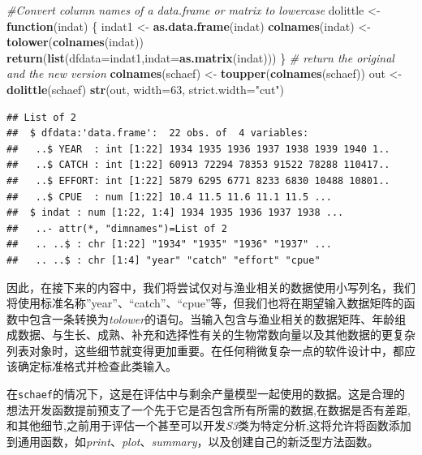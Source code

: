 \documentclass[
  lang=cn,
  11pt,
  scheme=chinese,
  chinesefont=nofont,
  citestyle=gb7714-2015,
  bibstyle=gb7714-2015]{elegantbook}
\newenvironment{Shaded}{\begin{snugshade}}{\end{snugshade}}
\newcommand{\AttributeTok}[1]{\textcolor[rgb]{0.13,0.29,0.53}{#1}}
\newcommand{\CommentTok}[1]{\textcolor[rgb]{0.56,0.35,0.01}{\textit{#1}}}
\newcommand{\ControlFlowTok}[1]{\textcolor[rgb]{0.13,0.29,0.53}{\textbf{#1}}}
\newcommand{\DecValTok}[1]{\textcolor[rgb]{0.00,0.00,0.81}{#1}}
\newcommand{\FunctionTok}[1]{\textcolor[rgb]{0.13,0.29,0.53}{\textbf{#1}}}
\newcommand{\NormalTok}[1]{#1}
\newcommand{\OtherTok}[1]{\textcolor[rgb]{0.56,0.35,0.01}{#1}}
\newcommand{\StringTok}[1]{\textcolor[rgb]{0.31,0.60,0.02}{#1}}
\begin{document}
\begin{Shaded}
\begin{Highlighting}[]
 \CommentTok{\#Convert column names of a data.frame or matrix to lowercase  }
\NormalTok{dolittle }\OtherTok{\textless{}{-}} \ControlFlowTok{function}\NormalTok{(indat) \{  }
\NormalTok{   indat1 }\OtherTok{\textless{}{-}} \FunctionTok{as.data.frame}\NormalTok{(indat)  }
   \FunctionTok{colnames}\NormalTok{(indat) }\OtherTok{\textless{}{-}} \FunctionTok{tolower}\NormalTok{(}\FunctionTok{colnames}\NormalTok{(indat))  }
   \FunctionTok{return}\NormalTok{(}\FunctionTok{list}\NormalTok{(}\AttributeTok{dfdata=}\NormalTok{indat1,}\AttributeTok{indat=}\FunctionTok{as.matrix}\NormalTok{(indat)))  }
\NormalTok{\} }\CommentTok{\# return the original and the new version  }
\FunctionTok{colnames}\NormalTok{(schaef) }\OtherTok{\textless{}{-}} \FunctionTok{toupper}\NormalTok{(}\FunctionTok{colnames}\NormalTok{(schaef))  }
\NormalTok{out }\OtherTok{\textless{}{-}} \FunctionTok{dolittle}\NormalTok{(schaef)  }
\FunctionTok{str}\NormalTok{(out, }\AttributeTok{width=}\DecValTok{63}\NormalTok{, }\AttributeTok{strict.width=}\StringTok{"cut"}\NormalTok{)  }
\end{Highlighting}
\end{Shaded}

\begin{verbatim}
## List of 2
##  $ dfdata:'data.frame':  22 obs. of  4 variables:
##   ..$ YEAR  : int [1:22] 1934 1935 1936 1937 1938 1939 1940 1..
##   ..$ CATCH : int [1:22] 60913 72294 78353 91522 78288 110417..
##   ..$ EFFORT: int [1:22] 5879 6295 6771 8233 6830 10488 10801..
##   ..$ CPUE  : num [1:22] 10.4 11.5 11.6 11.1 11.5 ...
##  $ indat : num [1:22, 1:4] 1934 1935 1936 1937 1938 ...
##   ..- attr(*, "dimnames")=List of 2
##   .. ..$ : chr [1:22] "1934" "1935" "1936" "1937" ...
##   .. ..$ : chr [1:4] "year" "catch" "effort" "cpue"
\end{verbatim}

因此，在接下来的内容中，我们将尝试仅对与渔业相关的数据使用小写列名，我们将使用标准名称''year''、``catch''、``cpue''等，但我们也将在期望输入数据矩阵的函数中包含一条转换为\emph{tolower}的语句。当输入包含与渔业相关的数据矩阵、年龄组成数据、与生长、成熟、补充和选择性有关的生物常数向量以及其他数据的更复杂列表对象时，这些细节就变得更加重要。在任何稍微复杂一点的软件设计中，都应该确定标准格式并检查此类输入。

在\texttt{schaef}的情况下，这是在评估中与剩余产量模型一起使用的数据。这是合理的想法开发函数提前预支了一个先于它是否包含所有所需的数据,在数据是否有差距,和其他细节,之前用于评估一个甚至可以开发\emph{S3}类为特定分析,这将允许将函数添加到通用函数，如\emph{print}、\emph{plot}、\emph{summary}，以及创建自己的新泛型方法函数。
\end{document}
